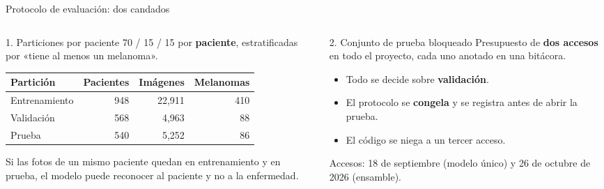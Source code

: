 \documentclass[aspectratio=169,10pt]{beamer}
\begin{document}
\begin{frame}{Protocolo de evaluación: dos candados}
  \begin{columns}[T]
    \begin{column}{0.48\textwidth}
      \begin{block}{1. Particiones por paciente}
        70 / 15 / 15 por \textbf{paciente}, estratificadas por «tiene al menos un melanoma».
      \end{block}
      \begin{center}
        \footnotesize\setlength{\tabcolsep}{4pt}
        \begin{tabular}{lrrr}
          \toprule
          \textbf{Partición} & \textbf{Pacientes} & \textbf{Imágenes} & \textbf{Melanomas} \\
          \midrule
          Entrenamiento & 948 & 22,911 & 410 \\
          Validación & 568 & 4,963 & 88 \\
          Prueba & 540 & 5,252 & 86 \\
          \bottomrule
        \end{tabular}
      \end{center}
      \small Si las fotos de un mismo paciente quedan en entrenamiento y en prueba, el modelo puede reconocer al paciente y no a la enfermedad.
    \end{column}
    \begin{column}{0.48\textwidth}
      \begin{block}{2. Conjunto de prueba bloqueado}
        Presupuesto de \textbf{dos accesos} en todo el proyecto, cada uno anotado en una bitácora.
        \begin{itemize}
          \item Todo se decide sobre \textbf{validación}.
          \item El protocolo se \textbf{congela} y se registra antes de abrir la prueba.
          \item El código se niega a un tercer acceso.
        \end{itemize}
      \end{block}
      \small Accesos: 18 de septiembre (modelo único) y 26 de octubre de 2026 (ensamble).
    \end{column}
  \end{columns}
\end{frame}
\end{document}
